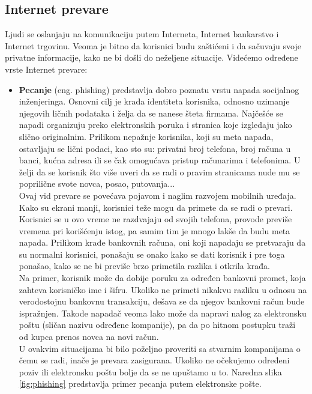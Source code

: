 \documentclass[a4paper]{article}
\begin{document}
\subsection{Internet prevare}
\label{subsec:podnaslovIP2}
Ljudi se oslanjaju na komunikaciju putem Interneta, Internet bankarstvo i Internet trgovinu. Veoma je bitno da korisnici budu zaštićeni i da sačuvaju svoje privatne informacije, kako ne bi došli do neželjene situacije. Videćemo određene vrste Internet prevare:
\begin{itemize}
\item\textbf{Pecanje} (eng. phishing) predstavlja dobro poznatu vrstu napada socijalnog inženjeringa. Osnovni cilj je krađa identiteta korisnika, odnosno uzimanje njegovih ličnih podataka i želja da se nanese šteta firmama. Najčešće se napadi organizuju preko elektronskih poruka i stranica koje izgledaju jako slično originalnim. Prilikom nepažnje korisnika, koji su meta napada, ostavljaju se lični podaci, kao sto su: privatni broj telefona, broj računa u banci, kućna adresa ili se čak omogućava pristup računarima i telefonima. U želji da se korisnik što više uveri da se radi o pravim stranicama nude mu se poprilične svote novca, posao, putovanja...\\Ovaj vid prevare se povećava pojavom i naglim razvojem mobilnih uređaja. Kako su ekrani manji, korisnici teže mogu da primete da se radi o prevari. Korisnici se u ovo vreme ne razdvajaju od svojih telefona, provode previše vremena pri korišćenju istog, pa samim tim je mnogo lakše da budu meta napada. Prilikom krađe bankovnih računa, oni koji napadaju se pretvaraju da su normalni korisnici, ponašaju se onako kako se dati korisnik i pre toga ponašao, kako se ne bi previše brzo primetila razlika i otkrila krađa. 
\\Na primer, korisnik može da dobije poruku za određen bankovni promet, koja zahteva korisničko ime i šifru. Ukoliko ne primeti nikakvu razliku u odnosu na verodostojnu bankovnu transakciju, dešava se da njegov bankovni račun bude ispražnjen. Takođe napadač veoma lako može da napravi nalog za elektronsku poštu (sličan nazivu određene kompanije), pa da po hitnom postupku traži od kupca prenos novca na novi račun. \\U ovakvim situacijama bi bilo poželjno proveriti sa stvarnim kompanijama o čemu se radi, inače je prevara zasigurana. Ukoliko ne očekujemo određeni poziv ili elektronsku poštu bolje da se ne upuštamo u to. Naredna slika \ref{fig:phishing} predstavlja primer pecanja putem elektronske pošte.



\end{itemize}
\end{document}

